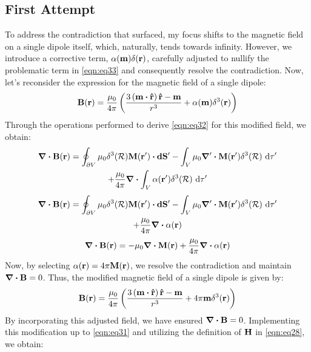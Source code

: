 \documentclass{article}
\numberwithin{equation}{section}
\begin{document}
\subsection{First Attempt}
To address the contradiction that surfaced, my focus shifts to the magnetic field on a single dipole itself, which, naturally, tends towards infinity. However, we introduce a corrective term, $\vb{\alpha}(\vb{m})\delta(\vb{r})$, carefully adjusted to nullify the problematic term in \eqref{eqn:eq33} and consequently resolve the contradiction. Now, let's reconsider the expression for the magnetic field of a single dipole:
\begin{gather}
\vb{B}(\vb{r})=\frac{\mu_0}{4\pi} \left( \frac{3\left( \vb{m}\vdot\vu{r}\right)\vu{r}-\vb{m}}{r^3}+\vb{\alpha}(\vb{m})\delta^3(\vb{r})\right)\label{eqn:eq35}
\end{gather}
Through the operations performed to derive \eqref{eqn:eq32} for this modified field, we obtain:
\begin{multline}
\div\vb{B}(\vb{r})=\oint_{\partial V} \mu_0 \delta^3(\vb{\mathcal{R}}) \vb{M}(\vb{r'})\vdot\vb{dS'}-\int_V \mu_0 \grad'\vdot\vb{M}(\vb{r'}) \delta^3(\vb{\mathcal{R}}) \ \dd\tau'\\+\frac{\mu_0}{4\pi}\div\int_V\vb{\alpha}(\vb{r'})\delta^3(\vb{\mathcal{R}})\ \dd\tau'\nonumber
\end{multline}
\begin{multline}
\div\vb{B}(\vb{r})=\oint_{\partial V} \mu_0 \delta^3(\vb{\mathcal{R}}) \vb{M}(\vb{r'})\vdot\vb{dS'}-\int_V \mu_0 \grad'\vdot\vb{M}(\vb{r'}) \delta^3(\vb{\mathcal{R}}) \ \dd\tau'\\+\frac{\mu_0}{4\pi}\div\vb{\alpha}(\vb{r})\nonumber
\end{multline}
\begin{gather}
\div\vb{B}(\vb{r})=-\mu_0\div\vb{M}(\vb{r}) + \frac{\mu_0}{4\pi}\div\vb{\alpha}(\vb{r})\label{eqn:eq36}
\end{gather}
Now, by selecting $\vb{\alpha}(\vb{r})=4\pi\vb{M}(\vb{r})$, we resolve the contradiction and maintain $\div\vb{B}=0$. Thus, the modified magnetic field of a single dipole is given by:
\begin{gather}
\vb{B}(\vb{r})=\frac{\mu_0}{4\pi} \left( \frac{3\left( \vb{m}\vdot\vu{r}\right)\vu{r}-\vb{m}}{r^3}+4\pi\vb{m}\delta^3(\vb{r})\right)\label{eqn:eq37}
\end{gather}
By incorporating this adjusted field, we have ensured $\div\vb{B}=0$. Implementing this modification up to \eqref{eqn:eq31} and utilizing the definition of $\vb{H}$ in \eqref{eqn:eq28}, we obtain:
\end{document}
